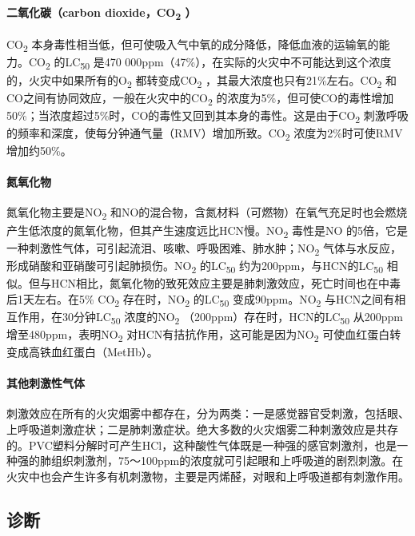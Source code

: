 \paragraph{二氧化碳（carbon dioxide，CO\textsubscript{2} ）}

CO\textsubscript{2}
本身毒性相当低，但可使吸入气中氧的成分降低，降低血液的运输氧的能力。CO\textsubscript{2}
的LC\textsubscript{50} 是470
000ppm（47\%），在实际的火灾中不可能达到这个浓度的，火灾中如果所有的O\textsubscript{2}
都转变成CO\textsubscript{2}
，其最大浓度也只有21\%左右。CO\textsubscript{2}
和CO之间有协同效应，一般在火灾中的CO\textsubscript{2}
的浓度为5\%，但可使CO的毒性增加50\%；当浓度超过5\%时，CO的毒性又回到其本身的毒性。这是由于CO\textsubscript{2}
刺激呼吸的频率和深度，使每分钟通气量（RMV）增加所致。CO\textsubscript{2}
浓度为2\%时可使RMV增加约50\%。

\paragraph{氮氧化物}

氮氧化物主要是NO\textsubscript{2}
和NO的混合物，含氮材料（可燃物）在氧气充足时也会燃烧产生低浓度的氮氧化物，但其产生速度远比HCN慢。NO\textsubscript{2}
毒性是NO
的5倍，它是一种刺激性气体，可引起流泪、咳嗽、呼吸困难、肺水肿；NO\textsubscript{2}
气体与水反应，形成硝酸和亚硝酸可引起肺损伤。NO\textsubscript{2}
的LC\textsubscript{50} 约为200ppm，与HCN的LC\textsubscript{50}
相似。但与HCN相比，氮氧化物的致死效应主要是肺刺激效应，死亡时间也在中毒后1天左右。在5\%
CO\textsubscript{2} 存在时，NO\textsubscript{2} 的LC\textsubscript{50}
变成90ppm。NO\textsubscript{2}
与HCN之间有相互作用，在30分钟LC\textsubscript{50}
浓度的NO\textsubscript{2} （200ppm）存在时，HCN的LC\textsubscript{50}
从200ppm增至480ppm，表明NO\textsubscript{2}
对HCN有拮抗作用，这可能是因为NO\textsubscript{2}
可使血红蛋白转变成高铁血红蛋白（MetHb）。

\paragraph{其他刺激性气体}

刺激效应在所有的火灾烟雾中都存在，分为两类：一是感觉器官受刺激，包括眼、上呼吸道刺激症状；二是肺刺激症状。绝大多数的火灾烟雾二种刺激效应是共存的。PVC塑料分解时可产生HCl，这种酸性气体既是一种强的感官刺激剂，也是一种强的肺组织刺激剂，75～100ppm的浓度就可引起眼和上呼吸道的剧烈刺激。在火灾中也会产生许多有机刺激物，主要是丙烯醛，对眼和上呼吸道都有刺激作用。

\subsection{诊断}

